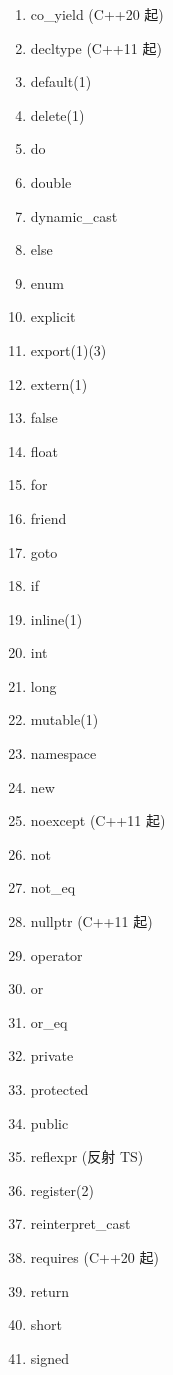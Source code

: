 \begin{appendices}
\begin{multicols}{2}
\begin{enumerate}
        \item co\_yield (C++20 起)
        \item decltype (C++11 起)
        \item default(1)
        \item delete(1)
        \item do
        \item double
        \item dynamic\_cast
        \item else
        \item enum
        \item explicit
        \item export(1)(3)
        \item extern(1)
        \item false
        \item float
        \item for
        \item friend
        \item goto
        \item if
        \item inline(1)
        \item int
        \item long
        \item mutable(1)
        \item namespace
        \item new
        \item noexcept (C++11 起)
        \item not
        \item not\_eq
        \item nullptr (C++11 起)
        \item operator
        \item or
        \item or\_eq
        \item private
        \item protected
        \item public
        \item reflexpr (反射 TS)
        \item register(2)
        \item reinterpret\_cast
        \item requires (C++20 起)
        \item return
        \item short
        \item signed

\end{enumerate}
\end{multicols}
\end{appendices}
